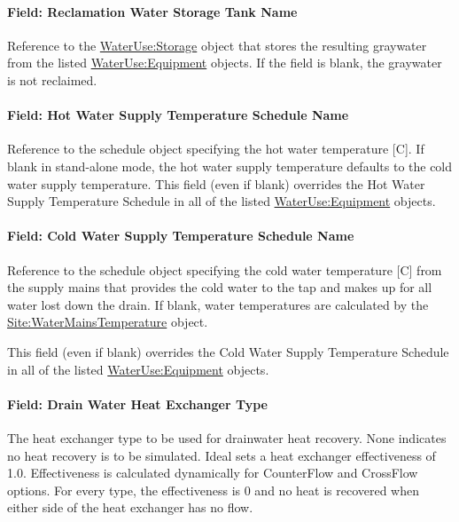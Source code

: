\paragraph{Field: Reclamation Water Storage Tank Name}\label{field-reclamation-water-storage-tank-name}

Reference to the \hyperref[waterusestorage]{WaterUse:Storage} object that stores the resulting graywater from the listed \hyperref[wateruseequipment]{WaterUse:Equipment} objects. If the field is blank, the graywater is not reclaimed.

\paragraph{Field: Hot Water Supply Temperature Schedule Name}\label{field-hot-water-supply-temperature-schedule-name-1}

Reference to the schedule object specifying the hot water temperature {[}C{]}. If blank in stand-alone mode, the hot water supply temperature defaults to the cold water supply temperature. This field (even if blank) overrides the Hot Water Supply Temperature Schedule in all of the listed \hyperref[wateruseequipment]{WaterUse:Equipment} objects.

\paragraph{Field: Cold Water Supply Temperature Schedule Name}\label{field-cold-water-supply-temperature-schedule-name-1-000}

Reference to the schedule object specifying the cold water temperature {[}C{]} from the supply mains that provides the cold water to the tap and makes up for all water lost down the drain. If blank, water temperatures are calculated by the \hyperref[sitewatermainstemperature]{Site:WaterMainsTemperature} object.

This field (even if blank) overrides the Cold Water Supply Temperature Schedule in all of the listed \hyperref[wateruseequipment]{WaterUse:Equipment} objects.

\paragraph{Field: Drain Water Heat Exchanger Type}\label{field-drain-water-heat-exchanger-type}

The heat exchanger type to be used for drainwater heat recovery. None indicates no heat recovery is to be simulated. Ideal sets a heat exchanger effectiveness of 1.0. Effectiveness is calculated dynamically for CounterFlow and CrossFlow options. For every type, the effectiveness is 0 and no heat is recovered when either side of the heat exchanger has no flow.

